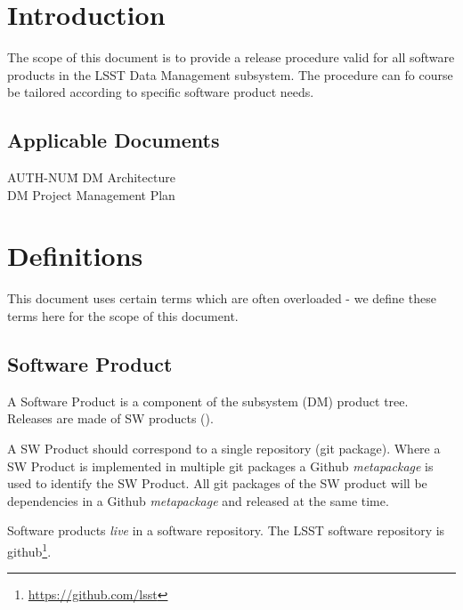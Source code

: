 \section{Introduction} \label{sec:intro}

The scope of this document is to provide a release procedure valid for all software products in the LSST Data Management subsystem. The procedure  can fo course be tailored according to specific software product needs.

\subsection{Applicable Documents}

\begin{tabbing}
AUTH-NUM\= \kill
{} \>     DM Architecture\\
 \>     DM Project Management Plan   \\
\end{tabbing}


\newpage
\section{Definitions} \label{sec:definitions}

This document uses certain terms which are often overloaded -  we define these terms here for the scope of this document.


\subsection{Software Product} \label{sect:swprod}

A Software Product is a component of the subsystem (DM) product tree.
Releases are made of  SW products ().

A SW Product should correspond to a single repository (git package).
Where a SW Product is implemented in multiple git packages
a Github \textit{metapackage} is used to identify the SW Product.
All git packages of the SW product will be dependencies in a Github \textit{metapackage} and released at the same time.

Software products \textit{live} in a software repository. The LSST software repository is github\footnote{\url{https://github.com/lsst}}.

